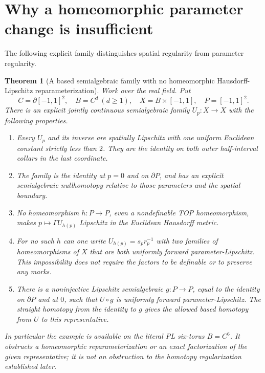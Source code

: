 \documentclass[11pt,a4paper]{article}
\newtheorem{theorem}{Theorem}[section]
\theoremstyle{definition}
\begin{document}
\section{Why a homeomorphic parameter change is insufficient}
The following explicit family distinguishes spatial regularity from parameter regularity.

\begin{theorem}[A based semialgebraic family with no homeomorphic Hausdorff-Lipschitz reparameterization]\label{result-16}
Work over the real field. Put
\[
 C=\partial[-1,1]^2,\quad B=C^d\ (d\ge1),\quad
 X=B\times[-1,1],\quad P=[-1,1]^2.
\]
There is an explicit jointly continuous semialgebraic family
$U_p:X\to X$ with the following properties.
\begin{enumerate}
\item Every $U_p$ and its inverse are spatially Lipschitz with one
uniform Euclidean constant strictly less than $2$. They are the
identity on both outer half-interval collars in the last coordinate.
\item The family is the identity at $p=0$ and on $\partial P$, and
has an explicit semialgebraic nullhomotopy relative to those parameters
and the spatial boundary.
\item No homeomorphism $h:P\to P$, even a nondefinable TOP
homeomorphism, makes $p\mapsto\Gamma U_{h(p)}$ Lipschitz in the
Euclidean Hausdorff metric.
\item For no such $h$ can one write $U_{h(p)}=s_pr_p^{-1}$ with
two families of homeomorphisms of $X$ that are both uniformly
forward parameter-Lipschitz. This impossibility does not require
the factors to be definable or to preserve any marks.
\item There is a noninjective Lipschitz semialgebraic
$g:P\to P$, equal to the identity on $\partial P$ and at $0$,
such that $U\circ g$ is uniformly forward parameter-Lipschitz.
The straight homotopy from the identity to $g$ gives the allowed
based homotopy from $U$ to this representative.
\end{enumerate}
In particular the example is available on the literal PL six-torus
$B=C^6$. It obstructs a homeomorphic reparameterization or an exact
factorization of the given representative; it is not an obstruction
to the homotopy regularization established later.
\end{theorem}
\end{document}
